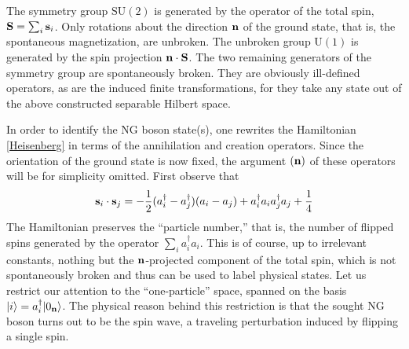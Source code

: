 \documentclass[final,2p,times,12pt,sort&compress]{elsarticle}
\newcommand\gr[1]{\mathrm{#1}}              %
\newcommand\vek[1]{{\boldsymbol{\bf #1}}}   %
\newcommand\skal[2]{\vek{#1}\cdot\vek{#2}}  %
\newcommand\ket[1]{\vert#1\rangle}          %
\newcommand\he[1]{#1^{\dagger}}             %
\begin{document}
The symmetry group $\gr{SU(2)}$ is generated by the operator of the total spin,
$\vek S=\sum_i\vek s_i$. Only rotations about the direction $\vek n$ of the
ground state, that is, the spontaneous magnetization, are unbroken. The
unbroken group $\gr{U(1)}$ is generated by the spin projection $\skal nS$. The
two remaining generators of the symmetry group are spontaneously broken. They
are obviously ill-defined operators, as are the induced finite transformations,
for they take any state out of the above constructed separable Hilbert space.

In order to identify the NG boson state(s), one rewrites the Hamiltonian
\eqref{Heisenberg} in terms of the annihilation and creation operators. Since
the orientation of the ground state is now fixed, the argument $(\vek n)$ of
these operators will be for simplicity omitted. First observe that
\begin{equation}
\vek s_i\cdot\vek s_j=-\frac12(\he a_i-\he a_j)(a_i-a_j)+\he a_ia_i\he
a_ja_j+\frac14
\label{Heis_Ham_second_quantization}
\end{equation}
The Hamiltonian preserves the ``particle number,'' that is, the number of
flipped spins generated by the operator $\sum_i\he a_ia_i$. This is of course,
up to irrelevant constants, nothing but the $\vek n$-projected component of the
total spin, which is not spontaneously broken and thus can be used to label
physical states. Let us restrict our attention to the ``one-particle'' space,
spanned on the basis $\ket i=\he a_i\ket{0_{\vek n}}$. The physical reason
behind this restriction is that the sought NG boson turns out to be the spin
wave, a traveling perturbation induced by flipping a single spin.
\end{document}
